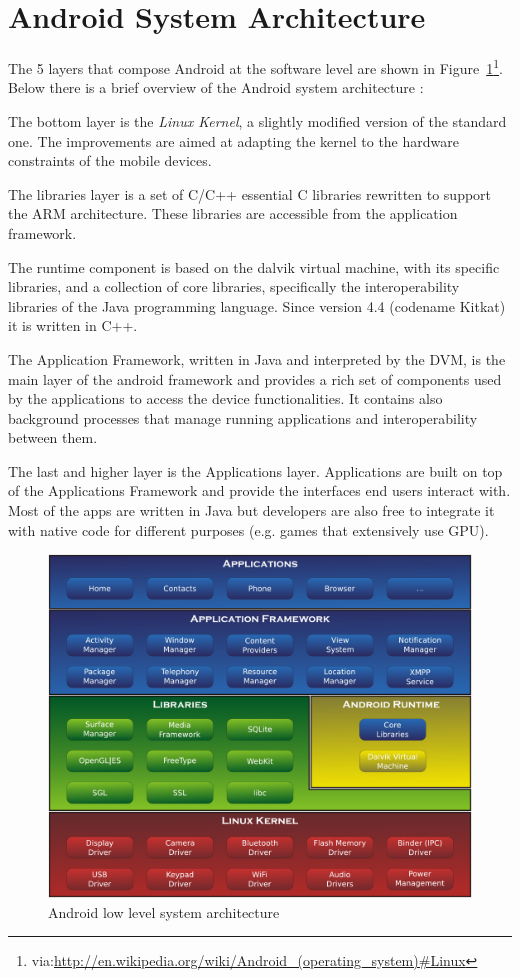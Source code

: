 \section{Android System Architecture}
\label{sec:bg_architecture}

The 5 layers that compose Android at the software level are shown in
Figure~\ref{fig:bg_architecture}\footnote{via:\url{http://en.wikipedia.org/wiki/Android\_(operating_system)\#Linux}}. Below
there is a brief overview of the Android system architecture \cite{ref13}:
\begin{enumerate*}
  \item The bottom layer is the \textit{Linux Kernel}, a slightly modified version of the standard one. The improvements are aimed at adapting the kernel to the hardware constraints of the mobile devices. 
  \item The libraries layer is a set of C/C++ essential C libraries rewritten to support the ARM architecture. These libraries are accessible from the application framework. 
  \item The runtime component is based on the dalvik virtual machine, with its specific libraries, and a collection of core libraries, specifically the interoperability libraries of the Java programming language. Since version 4.4 (codename Kitkat) it is written in C++. 
  \item The Application Framework, written in Java and interpreted by the DVM, is the main layer of the android framework and provides a rich set of components used by the applications to access the device functionalities. It contains also background processes that manage running applications and interoperability between them. 
  \item The last and higher layer is the Applications layer. Applications are built on top of the Applications Framework and provide the interfaces end users interact with. Most of the apps are written in Java but developers are also free to integrate it with native code for different purposes (e.g. games that extensively use GPU).
\end{enumerate*}

\begin{figure}[!h]
    \centering
    \includegraphics[width=1\textwidth]{./img/architecture/architecture.pdf}
    \caption{Android low level system architecture}
    \label{fig:bg_architecture}
\end{figure}
